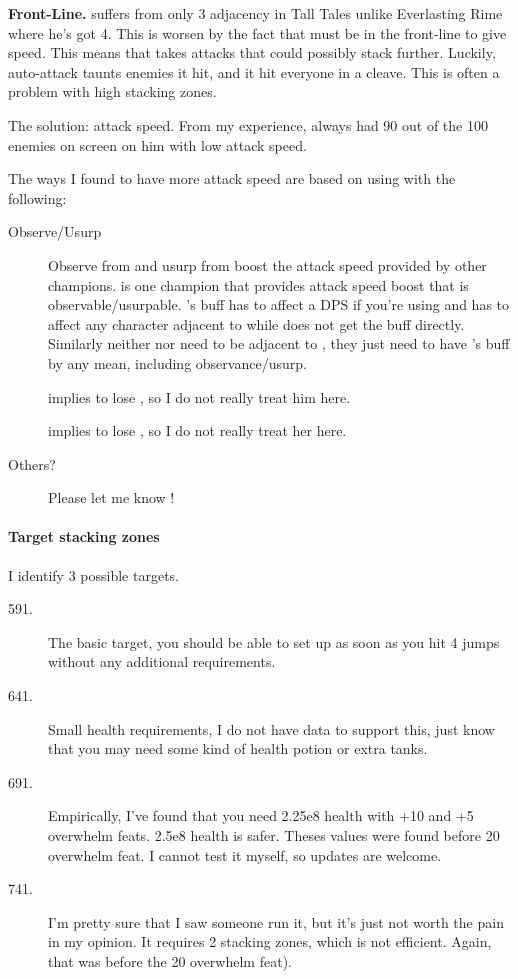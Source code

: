 \documentclass{article}
\begin{document}
\textbf{\hewmaan Front-Line.}
\hewmaan suffers from only 3 adjacency in Tall Tales unlike Everlasting Rime where he's got 4.
This is worsen by the fact that \hewmaan must be in the front-line to give speed.
This means that \hewmaan takes attacks that could possibly stack \briv further.
Luckily, \briv auto-attack taunts enemies it hit, and it hit everyone in a cleave.
This is often a problem with high stacking zones.

The solution: attack speed.
From my experience, \briv always had 90 out of the 100 enemies on screen on him with low attack speed.

The ways I found to have more attack speed are based on using \widdle with the following:
\begin{description}
    \item[Observe/Usurp] Observe from \artemis and usurp from \arkhan boost the attack speed provided by other champions.
    \hewmaan is one champion that provides attack speed boost that is observable/usurpable.
    \hewmaan's buff has to affect a DPS if you're using \artemis and has to affect any character adjacent to \arkhan while \arkhan does not get the buff directly.
    Similarly neither \artemis nor \arkhan need to be adjacent to \widdle, they just need to have \widdle's buff by any mean, including observance/usurp.
    
    \item[\nrakk] \nrakk implies to lose \hewmaan, so I do not really treat him here.
    
    \item[\alyndra] \alyndra implies to lose \shandie, so I do not really treat her here.
    
    \item[Others?] Please let me know !
\end{description}


\paragraph{Target stacking zones}

I identify 3 possible targets.
\begin{description}
    \item[591.] The basic target, you should be able to set up as soon as you hit 4 jumps without any additional requirements.
    \item[641.] Small health requirements, I do not have data to support this, just know that you may need some kind of health potion or extra tanks.
    \item[691.] Empirically, I've found that you need 2.25e8 health with +10 and +5 overwhelm feats.
    2.5e8 health is safer.
    Theses values were found before 20 overwhelm feat.
    I cannot test it myself, so updates are welcome.
    \item[741.] I'm pretty sure that I saw someone run it, but it's just not worth the pain in my opinion.
    It requires 2 stacking zones, which is not efficient.
    Again, that was before the 20 overwhelm feat).
\end{description}
\end{document}
